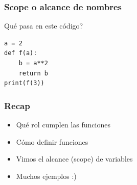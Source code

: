 \documentclass[14pt,aspectratio=169,xcolor=dvipsnames]{beamer}
\begin{document}
\begin{frame}[fragile]\frametitle{Scope o alcance de nombres}
Qué pasa en este código?

\begin{verbatim}
a = 2
def f(a):
    b = a**2
    return b
print(f(3))
\end{verbatim}

\end{frame}
\begin{frame}\frametitle{Recap}
    \begin{itemize}
        \item Qué rol cumplen las funciones
        \item Cómo definir funciones
        \item Vimos el alcance (scope) de variables
        \item Muchos ejemplos :)
    \end{itemize}
\end{frame}
\begin{frame}
    \maketitle
\end{frame}
\end{document}
